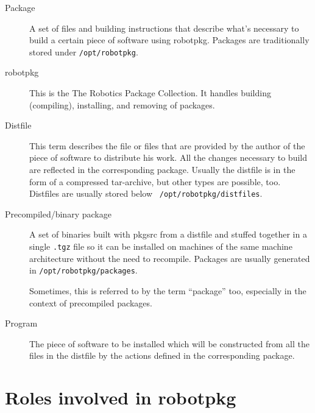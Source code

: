 \begin{description}
   \item[Package] A set of files and building instructions that describe what's
   necessary to build a certain piece  of software using robotpkg. Packages are
   traditionally stored under {\tt /opt/robotpkg}.

   \item[robotpkg]  This is  the The Robotics   Package Collection.  It handles
   building (compiling), installing, and removing of packages.

   \item[Distfile] This  term describes the file  or files that are provided by
   the author of the piece of software to distribute  his work. All the changes
   necessary to  build are reflected  in the corresponding package. Usually the
   distfile is in  the form of a  compressed  tar-archive, but other  types are
   possible,     too.    Distfiles   are      usually   stored    below    {\tt
   /opt/robotpkg/distfiles}.

   \item[Precompiled/binary package] A set of binaries built with pkgsrc from a
   distfile and  stuffed  together in a   single {\tt .tgz}  file so  it can be
   installed on machines of the  same machine architecture  without the need to
   recompile. Packages are usually generated in {\tt /opt/robotpkg/packages}.

   Sometimes, this is  referred to by the  term ``package''  too, especially in
   the context of precompiled packages.

   \item[Program]  The  piece  of  software to  be  installed  which  will   be
   constructed from all the files in the distfile by the actions defined in the
   corresponding package.

\end{description}


\section{Roles involved in robotpkg} %

